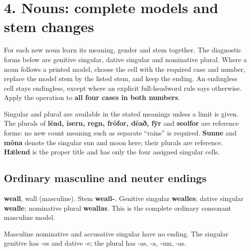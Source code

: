 \section*{4. Nouns: complete models and stem changes}

For each new noun learn its meaning, gender and stem together. The diagnostic forms below are genitive singular, dative singular and nominative plural. Where a noun follows a printed model, choose the cell with the required case and number, replace the model stem by the listed stem, and keep the ending. An endingless cell stays endingless, except where an explicit full-headword rule says otherwise. Apply the operation to \textbf{all four cases in both numbers}.

Singular and plural are available in the stated meanings unless a limit is given. The plurals of \textbf{lēad, īsern, regn, frōfor, dēað, fȳr} and \textbf{seolfor} are reference forms: no new count meaning such as separate “rains” is required. \textbf{Sunne} and \textbf{mōna} denote the singular sun and moon here; their plurals are reference. \textbf{Hǣlend} is the proper title and has only the four assigned singular cells.

\subsection*{Ordinary masculine and neuter endings}

\textbf{weall}, wall (masculine). Stem \textbf{weall-}. Genitive singular \textbf{wealles}; dative singular \textbf{wealle}; nominative plural \textbf{weallas}. This is the complete ordinary consonant masculine model.

Masculine nominative and accusative singular have no ending. The singular genitive has -es and dative -e; the plural has -as, -a, -um, -as.

